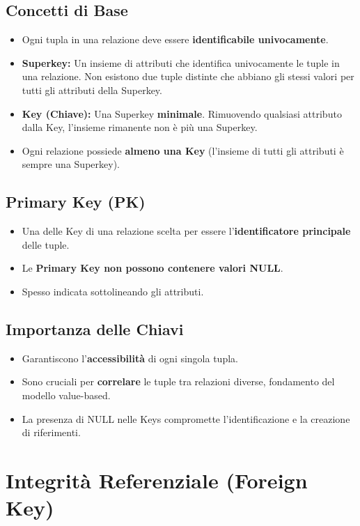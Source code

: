 \documentclass{article}
\begin{document}
	\subsection{Concetti di Base}
	\begin{itemize}
		\item Ogni tupla in una relazione deve essere \textbf{identificabile univocamente}.
		\item \textbf{Superkey:} Un insieme di attributi che identifica univocamente le tuple in una relazione. Non esistono due tuple distinte che abbiano gli stessi valori per tutti gli attributi della Superkey.
		\item \textbf{Key (Chiave):} Una Superkey \textbf{minimale}. Rimuovendo qualsiasi attributo dalla Key, l'insieme rimanente non è più una Superkey.
		\item Ogni relazione possiede \textbf{almeno una Key} (l'insieme di tutti gli attributi è sempre una Superkey).
	\end{itemize}
	
	\subsection{Primary Key (PK)}
	\begin{itemize}
		\item Una delle Key di una relazione scelta per essere l'\textbf{identificatore principale} delle tuple.
		\item Le \textbf{Primary Key non possono contenere valori NULL}.
		\item Spesso indicata sottolineando gli attributi.
	\end{itemize}
	
	\subsection{Importanza delle Chiavi}
	\begin{itemize}
		\item Garantiscono l'\textbf{accessibilità} di ogni singola tupla.
		\item Sono cruciali per \textbf{correlare} le tuple tra relazioni diverse, fondamento del modello value-based.
		\item La presenza di NULL nelle Keys compromette l'identificazione e la creazione di riferimenti.
	\end{itemize}
	
	\section{Integrità Referenziale (Foreign Key)}
	
\end{document}
